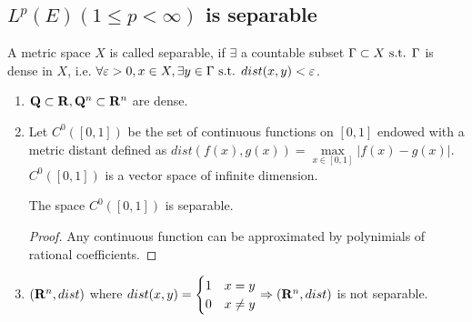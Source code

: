 \documentclass{article}
\begin{document}
\subsection{$L^p(E)(1\leq p< \infty)$ is separable }
\begin{Def}
A metric space $X$ is called separable, if $\exists$ a countable subset $\Gamma\subset X\text{ s.t. } \Gamma$ is dense in $X$, i.e. $\forall \varepsilon>0, x\in X,\exists y\in \Gamma\text{ s.t. } dist(x,y)<\varepsilon$.
\end{Def}
\begin{Eg}

\begin{enumerate}
\item $\mathbf{Q}\subset \mathbf{R}, \mathbf{Q}^n\subset \mathbf{R}^n$ are dense.

\item Let $C^0([0,1])$ be the set of continuous functions on $[0,1]$ endowed with a metric distant defined as $dist(f(x),g(x))=\max\limits_{x\in[0,1]}|f(x)-g(x)|$. $C^0([0,1])$ is a vector space of infinite dimension.
\begin{Thm}
The space $C^0([0,1])$ is separable.
\end{Thm}
\begin{proof}
Any continuous function can be approximated by polynimials of rational coefficients.
\end{proof}
\item$(\mathbf{R}^n,dist)$ where $dist(x,y)=\begin{cases}1&x=y\\0&x\neq y\end{cases}\Rightarrow(\mathbf{R}^n,dist)$ is not separable.
\end{enumerate}
\end{Eg}
\end{document}
